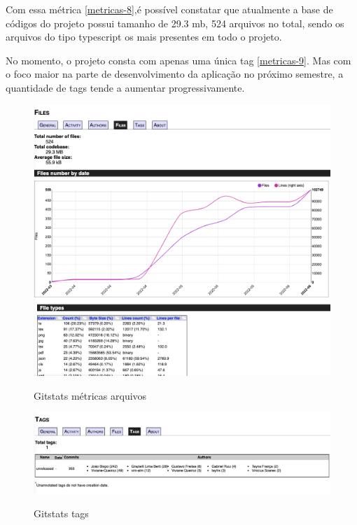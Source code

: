 Com essa métrica  \autoref{metricas-8},é possível constatar que atualmente a base de códigos do projeto possui tamanho de 29.3 \ac{mb}, 524 arquivos no total, sendo os arquivos do tipo typescript os mais presentes em todo o projeto. 

\pagebreak



No momento, o projeto consta com apenas uma única tag \autoref{metricas-9}. Mas com o foco maior na parte de desenvolvimento da aplicação no próximo semestre, a quantidade de tags tende a aumentar progressivamente.


\begin{figure}[htb]
	\centering
	\caption{\label{fig_arq_virado}Gitstats métricas arquivos}
	\includegraphics[width=1.00\textwidth]{anexos/metricas8.png}
	\label{metricas-8}
\end{figure}

\begin{figure}[htb]
	\centering
	\caption{\label{fig_arq_virado}Gitstats tags}
	\includegraphics[width=1.00\textwidth]{anexos/metricas9.png}
	\label{metricas-9}
\end{figure}